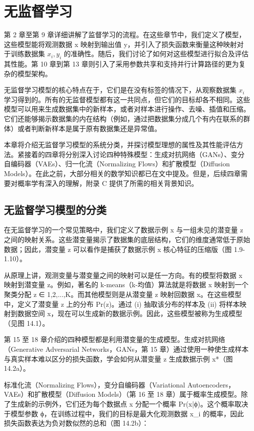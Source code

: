 \chapter{无监督学习}

第 2 章至第 9 章详细讲解了监督学习的流程。在这些章节中，我们定义了模型，这些模型能将观测数据 x 映射到输出值 y，并引入了损失函数来衡量这种映射对于训练数据集 \({x_i , y_i }\) 的准确性。随后，我们讨论了如何对这些模型进行拟合及评估其性能。第 10 章到第 13 章则引入了采用参数共享和支持并行计算路径的更为复杂的模型架构。

无监督学习模型的核心特点在于，它们是在没有标签的情况下，从观察数据集 \({x_i}\) 学习得到的。所有的无监督模型都有这一共同点，但它们的目标却各不相同。这些模型可以用来生成数据集中的新样本，或者对样本进行操作、去噪、插值和压缩。它们还能够揭示数据集的内在结构（例如，通过把数据集分成几个有内在联系的群体）或者判断新样本是属于原有数据集还是异常值。

本章将介绍无监督学习模型的系统分类，并探讨模型理想的属性及其性能评估方法。紧接着的四章将分别深入讨论四种特殊模型：生成对抗网络（GANs）、变分自编码器（VAEs）、归一化流（Normalizing Flows）和扩散模型（Diffusion Models）。在此之前，大部分相关的数学知识都已在文中提及。但是，后续四章需要对概率学有深入的理解，附录 C 提供了所需的相关背景知识。

\section{无监督学习模型的分类}
在无监督学习的一个常见策略中，我们定义了数据示例 x 与一组未见的潜变量 z 之间的映射关系。这些潜变量揭示了数据集的底层结构，它们的维度通常低于原始数据；因此，潜变量 z 可以看作是捕获了数据示例 x 核心特征的压缩版（图 1.9-1.10）。

从原理上讲，观测变量与潜变量之间的映射可以是任一方向。有的模型将数据 x 映射到潜变量 z。例如，著名的 k-means（k-均值）算法就是将数据 x 映射到一个聚类分配 z ∈ {1,2,...,K}。而其他模型则是从潜变量 z 映射回数据 x。在这些模型中，定义了潜变量 z 上的分布 Pr(z)。通过 (i) 抽取该分布的样本及 (ii) 将样本映射到数据空间 x，现在可以生成新的数据示例。因此，这些模型被称为生成模型（见图 14.1）。

第 15 至 18 章介绍的四种模型都是利用潜变量的生成模型。生成对抗网络（Generative Adversarial Networks，GANs，第 15 章）通过使用一种使生成样本与真实样本难以区分的损失函数，学会如何从潜变量 z 生成数据示例 x*（图 14.2a）。

标准化流（Normalizing Flows），变分自编码器（Variational Autoencoders，VAEs）和扩散模型（Diffusion Models）（第 16 至 18 章）属于概率生成模型。除了生成新的示例外，它们还为每个数据点 x 分配一个概率 Pr(x|ϕ)。这个概率取决于模型参数 ϕ，在训练过程中，我们的目标是最大化观测数据 {x_i} 的概率，因此损失函数表达为负对数似然的总和（图 14.2b）：

